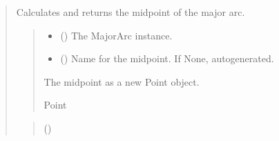 \documentclass[letterpaper,10pt,english]{sphinxmanual}
\begin{document}
\begin{quote}
\begin{fulllineitems}
\begin{fulllineitems}
\end{fulllineitems}


\begin{fulllineitems}
\label{\detokenize{pygeox:pygeox.basic_objects.MajorArc.midpoint}}
\pysigstartsignatures
\pysigline
{}
\pysigstopsignatures
\sphinxAtStartPar
Calculates and returns the midpoint of the major arc.
\begin{quote}\begin{description}
\begin{itemize}
\item {} 
\sphinxAtStartPar
{} () \textendash{} The MajorArc instance.

\item {} 
\sphinxAtStartPar
{} (\sphinxstyleliteralemphasis{\sphinxupquote{, }}) \textendash{} Name for the midpoint. If None, auto\sphinxhyphen{}generated.

\end{itemize}

\sphinxAtStartPar
The midpoint as a new Point object.

\sphinxAtStartPar
Point

\end{description}\end{quote}

\end{fulllineitems}


\begin{fulllineitems}
\label{\detokenize{pygeox:pygeox.basic_objects.MajorArc.mirror_across_line}}
\pysigstartsignatures
\pysiglinewithargsret
{}
{\sphinxparamcomma {}}
{}
\pysigstopsignatures\begin{quote}\begin{description}
\sphinxAtStartPar
{} ()


\end{description}
\end{quote}
\end{fulllineitems}
\end{fulllineitems}
\end{quote}
\end{document}
